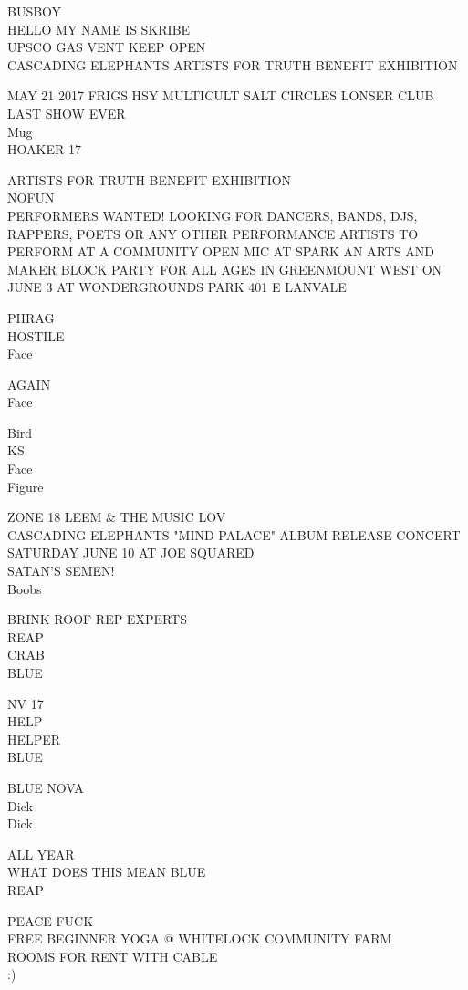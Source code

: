 \documentclass[10pt,letterpaper]{article}
\begin{document}
BUSBOY\\
HELLO MY NAME IS SKRIBE\\
UPSCO GAS VENT KEEP OPEN\\
CASCADING ELEPHANTS ARTISTS FOR TRUTH BENEFIT EXHIBITION

MAY 21 2017 FRIGS HSY MULTICULT SALT CIRCLES LONSER CLUB LAST SHOW EVER\\
Mug\\
HOAKER 17

ARTISTS FOR TRUTH BENEFIT EXHIBITION\\
NOFUN\\
PERFORMERS WANTED!  LOOKING FOR DANCERS, BANDS, DJS, RAPPERS, POETS OR ANY OTHER PERFORMANCE ARTISTS TO PERFORM AT A COMMUNITY OPEN MIC AT SPARK AN ARTS AND MAKER BLOCK PARTY FOR ALL AGES IN GREENMOUNT WEST ON JUNE 3 AT WONDERGROUNDS PARK 401 E LANVALE

PHRAG\\
HOSTILE\\
Face

AGAIN\\
Face

Bird\\
KS\\
Face\\
Figure

ZONE 18 LEEM \& THE MUSIC LOV\\
CASCADING ELEPHANTS "MIND PALACE" ALBUM RELEASE CONCERT SATURDAY JUNE 10 AT JOE SQUARED\\
SATAN'S SEMEN!\\
Boobs

BRINK ROOF REP EXPERTS\\
REAP\\
CRAB\\
BLUE

NV 17\\
HELP\\
HELPER\\
BLUE

BLUE NOVA\\
Dick\\
Dick

ALL YEAR\\
WHAT DOES THIS MEAN BLUE\\
REAP

PEACE FUCK\\
FREE BEGINNER YOGA @ WHITELOCK COMMUNITY FARM\\
ROOMS FOR RENT WITH CABLE\\
:)
\end{document}
